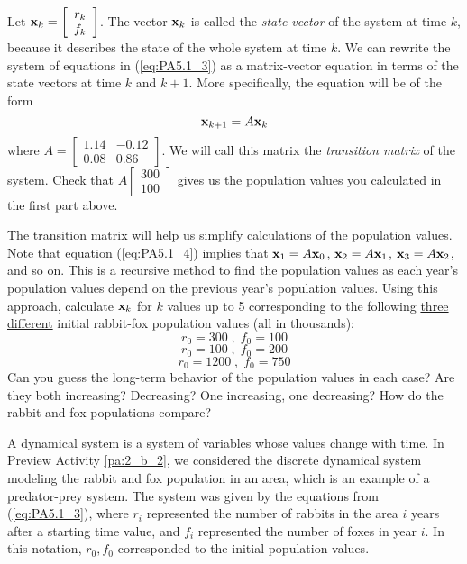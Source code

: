 \begin{pa}
\item Let $\mathbf{x}_k=\left[ \begin{array}{c} r_k \\ f_k \end{array} \right]$. The vector $\mathbf{x}_k$ is called the \emph{state vector} of the system at time $k$, because it describes the state of the whole system at time $k$. We can rewrite the system of equations in (\ref{eq:PA5.1_3}) as a matrix-vector equation in terms of the state vectors at time $k$ and $k+1$. More specifically, the equation will be of the form 
\begin{equation} \label{eq:PA5.1_4}
\mathbf{x}_{k+1} = A\mathbf{x}_k
\end{equation}
where $A = \left[ \begin{array}{cr} 1.14 & -0.12 \\ 0.08 & 0.86 \end{array} \right]$. We will call this matrix the \emph{transition matrix} of the system. Check that $A \left[ \begin{array}{c} 300\\100 \end{array} \right]$ gives us the population values you calculated in the first part above.

\item The transition matrix will help us simplify calculations of the population values. Note that equation (\ref{eq:PA5.1_4}) implies that $\mathbf{x}_1 = A\mathbf{x}_0$, $\mathbf{x}_2=A\mathbf{x}_1$, $\mathbf{x}_3=A\mathbf{x}_2$, and so on. This is a recursive method to find the population values as each year's population values depend on the previous year's population values. Using this approach, calculate $\mathbf{x}_k$ for $k$ values up to 5 corresponding to the following \underline{three different} initial rabbit-fox population values (all in thousands): 
\[ r_0=300 \;,\;  f_0=100 \]
\[ r_0=100 \;,\;  f_0=200 \]
\[ r_0=1200 \;,\; f_0=750\]
Can you guess the long-term behavior of the population values in each case? Are they both increasing? Decreasing? One increasing, one decreasing? How do the rabbit and fox populations compare?

	\ea


\ee
\end{pa}


A dynamical system is a system of variables whose values change with time. In Preview Activity \ref{pa:2_b_2}, we considered the discrete dynamical system modeling the rabbit and fox population in an area, which is an example of a predator-prey system. The system was given by the equations from (\ref{eq:PA5.1_3}), where $r_i$ represented the number of rabbits in the area $i$ years after a starting time value, and $f_i$ represented the number of foxes in year $i$. In this notation, $r_0, f_0$ corresponded to the initial population values.

